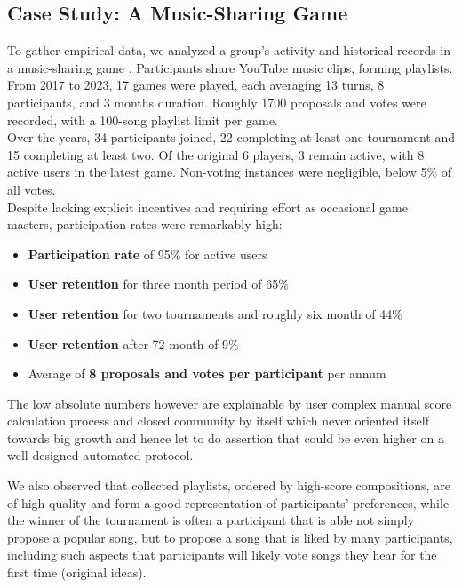 \documentclass{article}
\begin{document}
\begin{CJK}{UTF8}{gbsn}
\begin{multicols}{2}
        \section{Case Study: A Music-Sharing Game}
        To gather empirical data, we analyzed a group's activity and historical records in a music-sharing game \cite{DariusYoutube}. Participants share YouTube music clips, forming playlists. From 2017 to 2023, 17 games were played, each averaging 13 turns, 8 participants, and 3 months duration. Roughly 1700 proposals and votes were recorded, with a 100-song playlist limit per game.\\
        Over the years, 34 participants joined, 22 completing at least one tournament and 15 completing at least two. Of the original 6 players, 3 remain active, with 8 active users in the latest game. Non-voting instances were negligible, below 5\% of all votes. \\
        Despite lacking explicit incentives and requiring effort as occasional game masters, participation rates were remarkably high:
        \begin{itemize}[itemsep=0.03cm]
            \item \textbf{Participation rate} of 95\% for active users
            \item \textbf{User retention} for three month period of 65\%
            \item \textbf{User retention} for two tournaments and roughly six month of 44\%
            \item \textbf{User retention} after 72 month of 9\%
            \item Average of \textbf{8 proposals and votes per participant} per annum
        \end{itemize}

        The low absolute numbers however are explainable by user complex manual score calculation process and closed community by itself which never oriented itself towards big growth and hence let to do assertion that could be even higher on a well designed automated protocol.

        We also observed that collected playlists, ordered by high-score compositions, are of high quality and form a good representation of participants' preferences, while the winner of the tournament is often a participant that is able not simply propose a popular song, but to propose a song that is liked by many participants, including such aspects that participants will likely vote songs they hear for the first time (original ideas).


\end{multicols}
\end{CJK}
\end{document}
